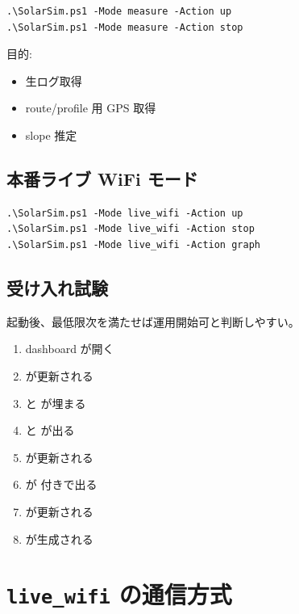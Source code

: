 \documentclass[a4paper,11pt]{article}
\begin{document}
\begin{Verbatim}[fontsize=\small]
.\SolarSim.ps1 -Mode measure -Action up
.\SolarSim.ps1 -Mode measure -Action stop
\end{Verbatim}

目的:

\begin{itemize}
  \item 生ログ取得
  \item route/profile 用 GPS 取得
  \item slope 推定
\end{itemize}

\subsection{本番ライブ WiFi モード}

\begin{Verbatim}[fontsize=\small]
.\SolarSim.ps1 -Mode live_wifi -Action up
.\SolarSim.ps1 -Mode live_wifi -Action stop
.\SolarSim.ps1 -Mode live_wifi -Action graph
\end{Verbatim}

\subsection{受け入れ試験}

 起動後、最低限次を満たせば運用開始可と判断しやすい。

\begin{enumerate}
  \item dashboard が開く
  \item {} が更新される
  \item {} と  が埋まる
  \item {} と  が出る
  \item {} が更新される
  \item {} が  付きで出る
  \item {} が更新される
  \item {} が生成される
\end{enumerate}

\section[live\_wifi の通信方式]{\texttt{live\_wifi} の通信方式}
\end{document}
